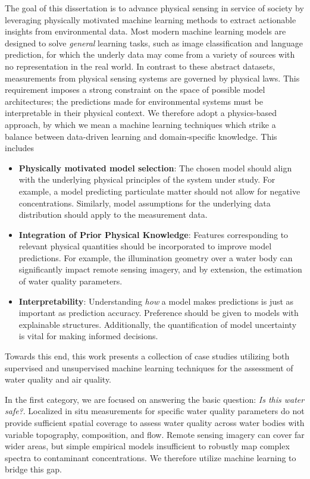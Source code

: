 The goal of this dissertation is to advance physical sensing in service of
society by leveraging physically motivated machine learning methods to extract
actionable insights from environmental data. Most modern machine learning models
are designed to solve \textit{general} learning tasks, such as image
classification and language prediction, for which the underly data may come
from a variety of sources with no representation in the real world.
In contrast to these abstract datasets, measurements from physical sensing systems
are governed by physical laws. This requirement imposes a strong constraint on
the space of possible model architectures; the predictions made
for environmental systems must be interpretable in their physical context. We
therefore adopt a physics-based approach, by which we mean a machine learning
techniques which strike a balance between data-driven learning and domain-specific
knowledge. This includes
\begin{itemize}
\item \textbf{Physically motivated model selection}: The chosen model should
  align with the underlying physical principles of the system under study. For
  example, a model predicting particulate matter should not allow for
  negative concentrations. Similarly, model assumptions for the underlying data
  distribution should apply to the measurement data.
\item \textbf{Integration of Prior Physical Knowledge}: Features corresponding
  to relevant physical quantities should be incorporated to improve model
  predictions. For example, the illumination geometry over a water body can
  significantly impact remote sensing imagery, and by extension, the
  estimation of water quality parameters.
\item \textbf{Interpretability}: Understanding \textit{how} a model makes
  predictions is just as important as prediction accuracy. Preference should be
  given to models with explainable structures. Additionally, the quantification of
  model uncertainty is vital for making informed decisions.
\end{itemize}
Towards this end, this work presents a collection of case studies utilizing both
supervised and unsupervised machine learning techniques for the assessment of
water quality and air quality.

In the first category, we are focused on answering the basic question:
\textit{Is this water safe?}. Localized in situ measurements for specific water
quality parameters do not provide sufficient spatial coverage to assess water
quality across water bodies with variable topography, composition, and flow. Remote
sensing imagery can cover far wider areas, but simple empirical models
insufficient to robustly map complex spectra to contaminant concentrations. We
therefore utilize machine learning to bridge this gap.

